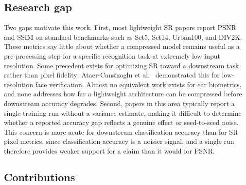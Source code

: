\documentclass[11pt]{article}
\begin{document}
\subsection{Research gap}

Two gaps motivate this work. First, most lightweight SR papers report PSNR and SSIM on standard benchmarks such as Set5, Set14, Urban100, and DIV2K. These metrics say little about whether a compressed model remains useful as a pre-processing step for a specific recognition task at extremely low input resolution. Some precedent exists for optimizing SR toward a downstream task rather than pixel fidelity: Ataer-Cansizoglu et al.~\cite{ataer2019identity} demonstrated this for low-resolution face verification. Almost no equivalent work exists for ear biometrics, and none addresses how far a lightweight architecture can be compressed before downstream accuracy degrades. Second, papers in this area typically report a single training run without a variance estimate, making it difficult to determine whether a reported accuracy gap reflects a genuine effect or seed-to-seed noise. This concern is more acute for downstream classification accuracy than for SR pixel metrics, since classification accuracy is a noisier signal, and a single run therefore provides weaker support for a claim than it would for PSNR.

\subsection{Contributions}
\end{document}
